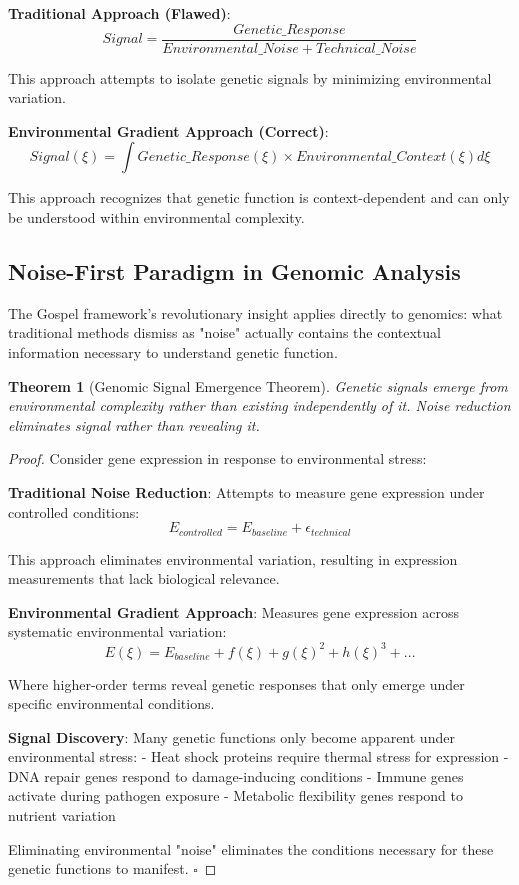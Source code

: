 \documentclass[12pt,a4paper]{article}
\newtheorem{theorem}{Theorem}[section]
\begin{document}
\textbf{Traditional Approach (Flawed)}:
$$Signal = \frac{Genetic\_Response}{Environmental\_Noise + Technical\_Noise}$$

This approach attempts to isolate genetic signals by minimizing environmental variation.

\textbf{Environmental Gradient Approach (Correct)}:
$$Signal(\xi) = \int Genetic\_Response(\xi) \times Environmental\_Context(\xi) d\xi$$

This approach recognizes that genetic function is context-dependent and can only be understood within environmental complexity.

\subsection{Noise-First Paradigm in Genomic Analysis}

The Gospel framework's revolutionary insight applies directly to genomics: what traditional methods dismiss as "noise" actually contains the contextual information necessary to understand genetic function.

\begin{theorem}[Genomic Signal Emergence Theorem]
Genetic signals emerge from environmental complexity rather than existing independently of it. Noise reduction eliminates signal rather than revealing it.
\end{theorem}

\begin{proof}
Consider gene expression in response to environmental stress:

\textbf{Traditional Noise Reduction}: Attempts to measure gene expression under controlled conditions:
$$E_{controlled} = E_{baseline} + \epsilon_{technical}$$

This approach eliminates environmental variation, resulting in expression measurements that lack biological relevance.

\textbf{Environmental Gradient Approach}: Measures gene expression across systematic environmental variation:
$$E(\xi) = E_{baseline} + f(\xi) + g(\xi)^2 + h(\xi)^3 + ...$$

Where higher-order terms reveal genetic responses that only emerge under specific environmental conditions.

\textbf{Signal Discovery}: Many genetic functions only become apparent under environmental stress:
- Heat shock proteins require thermal stress for expression
- DNA repair genes respond to damage-inducing conditions  
- Immune genes activate during pathogen exposure
- Metabolic flexibility genes respond to nutrient variation

Eliminating environmental "noise" eliminates the conditions necessary for these genetic functions to manifest. $\square$
\end{proof}
\end{document}
